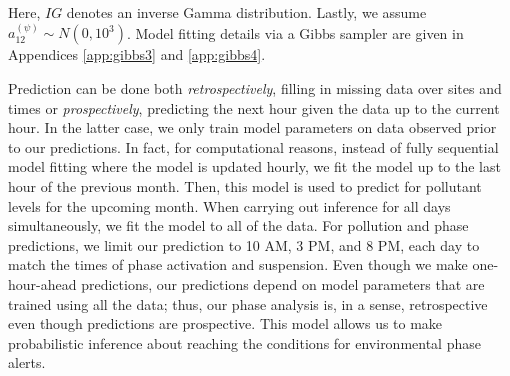 \documentclass[alpha-refs]{wiley-article}
\begin{document}
Here, $IG$ denotes an inverse Gamma distribution.  Lastly, we assume ${a^{(\psi)}_{12}} \sim N(0,10^3)$. Model fitting details via a Gibbs sampler are given in Appendices \ref{app:gibbs3} and \ref{app:gibbs4}.

Prediction can be done both \emph{retrospectively}, filling in missing data over sites and times or \emph{prospectively}, predicting the next hour given the data up to the current hour.
In the latter case, we only train model parameters on data observed prior to our predictions. In fact, for computational reasons, instead of fully sequential model fitting where the model is updated hourly, we fit the model up to the last hour of the previous month. Then, this model is used to predict for pollutant levels for the upcoming month.  When carrying out inference for all days simultaneously, we fit the model to all of the data. For pollution and phase predictions, we limit our prediction to 10 AM, 3 PM, and 8 PM, each day to match the times of phase activation and suspension. Even though we make one-hour-ahead predictions, our predictions depend on model parameters that are trained using all the data; thus, our phase analysis is, in a sense, retrospective even though predictions are prospective. This model allows us to make probabilistic inference about reaching the conditions for environmental phase alerts.
\end{document}
